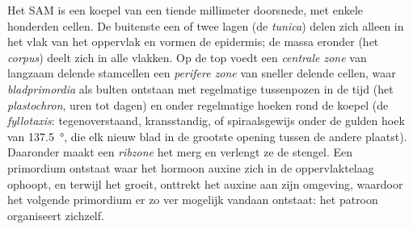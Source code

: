 \begin{proposition}[De scheuttop]\label{prop:b2:plant-meristems:sam}
Het SAM is een koepel van een tiende millimeter doorsnede, met enkele
honderden cellen. De buitenste een of twee lagen (de \emph{tunica}) delen
zich alleen in het vlak van het oppervlak en vormen de epidermis; de massa
eronder (het \emph{corpus}) deelt zich in alle vlakken. Op de top voedt een
\emph{centrale zone} van langzaam delende stamcellen een \emph{perifere
zone} van sneller delende cellen, waar \emph{bladprimordia} als bulten
ontstaan met regelmatige tussenpozen in de tijd (het \emph{plastochron},
uren tot dagen) en onder regelmatige hoeken rond de koepel (de
\emph{fyllotaxis}: tegenoverstaand, kransstandig, of spiraalsgewijs onder de
gulden hoek van \qty{137.5}{\degree}, die elk nieuw blad in de grootste
opening tussen de andere plaatst). Daaronder maakt een \emph{ribzone} het
merg en verlengt ze de stengel. Een primordium ontstaat waar het hormoon
auxine zich in de oppervlaktelaag ophoopt, en terwijl het groeit, onttrekt
het auxine aan zijn omgeving, waardoor het volgende primordium er zo ver
mogelijk vandaan ontstaat: het patroon organiseert zichzelf.
\end{proposition}

